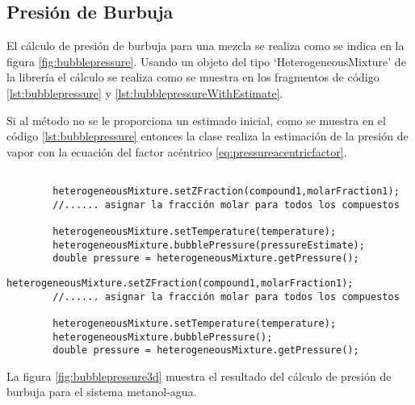 \subsection{Presión de Burbuja}\label{subsec:bubblepressure}

	El cálculo de presión de burbuja para una mezcla se realiza como se indica en la figura \ref{fig:bubblepressure}. Usando un objeto del tipo `HeterogeneousMixture' de la librería \Materia el cálculo se realiza como se muestra en los fragmentos de código \ref{lst:bubblepressure} y \ref{lst:bubblepressureWithEstimate}.

	Si al método no se le proporciona un estimado inicial, como se muestra en el código \ref{lst:bubblepressure} entonces la clase realiza la estimación de la presión de vapor con la ecuación del factor acéntrico \ref{eq:pressureacentricfactor}. 



	\begin{lstlisting}[label={lst:bubblepressureWithEstimate},caption={Cálculo de la presión de burbuja proporcionando un estimado inicial.}]

		heterogeneousMixture.setZFraction(compound1,molarFraction1);
		//...... asignar la fracción molar para todos los compuestos

		heterogeneousMixture.setTemperature(temperature);
		heterogeneousMixture.bubblePressure(pressureEstimate);
		double pressure = heterogeneousMixture.getPressure();
	\end{lstlisting}


	\begin{lstlisting}[label={lst:bubblepressure},caption={Cálculo de la presión de burbuja.}]
		heterogeneousMixture.setZFraction(compound1,molarFraction1);
		//...... asignar la fracción molar para todos los compuestos

		heterogeneousMixture.setTemperature(temperature);
		heterogeneousMixture.bubblePressure();
		double pressure = heterogeneousMixture.getPressure();
	\end{lstlisting}

	La figura \ref{fig:bubblepressure3d} muestra el resultado del cálculo de presión de burbuja para el sistema metanol-agua.


